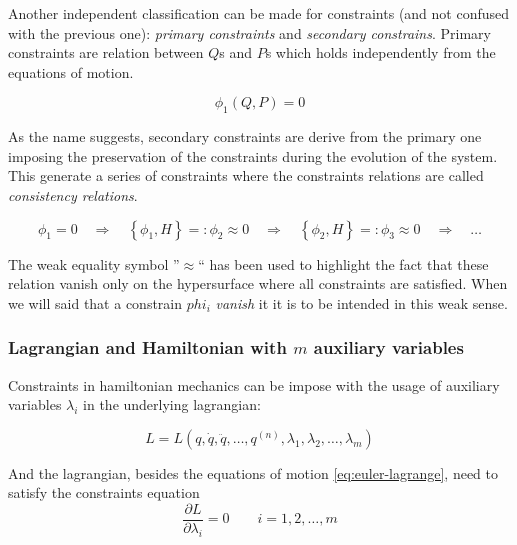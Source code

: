 Another independent classification can be made for constraints (and not confused
with the previous one): \emph{primary constraints} and \emph{secondary
constrains}.  Primary constraints are relation between $Q$s and $P$s which holds
independently from the equations of motion.

\begin{equation} \label{eq:constraint}
  \phi_1(Q, P) = 0
\end{equation}

As the name suggests, secondary constraints are derive from the primary one
imposing the preservation of the constraints during the evolution of the system.
This generate a series of constraints where the constraints relations are called
\emph{consistency relations}.

\begin{equation} \label{eq:consistency_relations}
  \phi_1 = 0 \quad \Rightarrow \quad
  \left\{ \phi_1 , H \right\} =: \phi_2 \approx 0 \quad \Rightarrow \quad
  \left\{ \phi_2 , H \right\} =: \phi_3 \approx 0 \quad \Rightarrow \quad
  \ldots
\end{equation}

The weak equality symbol ''$\approx$`` has been used to highlight the fact that
these relation vanish only on the hypersurface where all constraints are
satisfied. When we will said that a constrain $phi_i$ \emph{vanish} it it is to
be intended in this weak sense.

\subsubsection{Lagrangian and Hamiltonian with $m$ auxiliary variables}
Constraints in hamiltonian mechanics can be impose with the usage of auxiliary
variables $\lambda_i$ in the underlying lagrangian:

\begin{equation*}
  L = L(
  q, \dot{q}, \ddot{q}, \ldots, q^{(n)},
  \lambda_1, \lambda_2, \ldots, \lambda_m
  )
\end{equation*}

And the lagrangian, besides the equations of motion \eqref{eq:euler-lagrange},
need to satisfy the constraints equation
\begin{equation}
  \frac{\partial L}{\partial \lambda_i} = 0 \qquad i=1, 2, \ldots, m
\end{equation}

